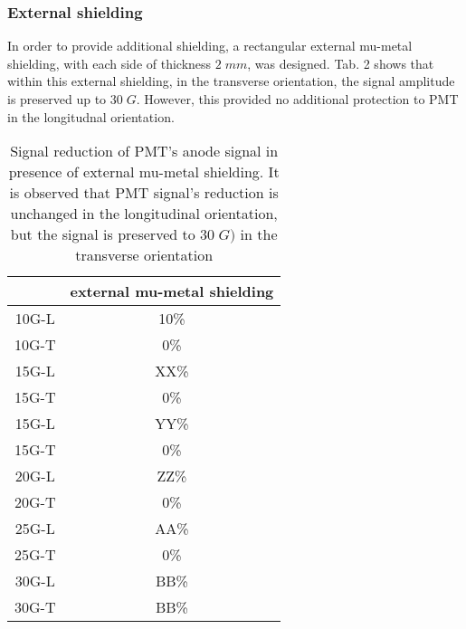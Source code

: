 \subsubsection{External shielding}
In order to provide additional shielding, a rectangular external mu-metal shielding, with each side of thickness $2\;mm$, was designed. Tab. 2 shows that within this external shielding, in the transverse orientation, the signal amplitude is preserved up to $30\;G$. However, this provided no additional protection to PMT in the longitudnal orientation.

\begin{table}[H]
	\begin{center}
		\begin{tabular}{|c|c|}
			\hline
	 		& external mu-metal shielding \\
			\hline
 			10G-L & 10\% \\
 			10G-T & 0\% \\ 
 			\hline
 			15G-L & XX\% \\
 			15G-T & 0\% \\
 			\hline
 			15G-L & YY\% \\
 			15G-T & 0\% \\
 			\hline
 			20G-L & ZZ\% \\
 			20G-T & 0\% \\
 			\hline
 			25G-L & AA\% \\
 			25G-T & 0\% \\
 			\hline
 			30G-L & BB\% \\
 			30G-T & BB\% \\
 			\hline
		\end{tabular}
	\end{center}
	\caption{Signal reduction of PMT's anode signal in presence of external mu-metal shielding. It is observed that PMT signal's reduction is unchanged in the longitudinal orientation, but the signal is preserved to $30\;G)$ in the transverse orientation}
\end{table}
